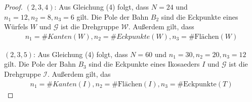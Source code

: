 \begin{proof}
$(2,3,4)$: Aus Gleichung (4) folgt, dass $N = 24$ und $n_1 = 12, n_2 = 8, n_3 = 6$ gilt. Die Pole der Bahn $B_2$ sind die Eckpunkte eines Würfels $W$ und $\mathcal{G}$ ist die Drehgruppe $\mathcal{W}$. Außerdem gilt, dass
\begin{align*}
n_1 = \# Kanten(W),n_2 = \# Eckpunkte(W),n_3 = \# \text{Flächen}(W)
\end{align*}


$(2,3,5)$: Aus Gleichung (4) folgt, dass $N = 60$ und $n_1 = 30, n_2 = 20, n_3= 12$ gilt. Die Pole der Bahn $B_3$ sind die Eckpunkte eines Ikosaeders $I$ und $\mathcal{G}$ ist die Drehgruppe $\mathcal{I}$. Außerdem gilt, das
\begin{align*}
n_1 = \# Kanten(I),n_2 = \# \text{Flächen}(I),n_3 = \# \text{Eckpunkte}(T)
\end{align*}
\end{proof}
